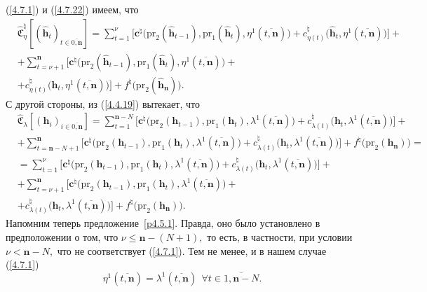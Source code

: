 \documentclass[11pt,twoside]{report}
\newcommand{\bfn}{\begin{equation}}
\newcommand{\efn}{\end{equation}}
\newcommand{\ov}{\overline}
\newcommand{\la}{\lambda}
\newcommand{\fa}{\forall}
\newcommand{\zc}{{\mathbf c}}
\newcommand{\nn}{{\mathbf n}}
\begin{document}
{{(\ref{4.7.1}) и (\ref{4.7.22}) имеем, что
\begin{eqnarray}
&\widehat{\mathfrak{C}}_\eta^\natural[(\hat{\mathbf{h}}_t)_{t\in\ov{0,\nn}}] = \sum\limits_{t=1}^\nu\bigl[
\zc^\natural\bigl(\mathrm{pr}_2(\hat{\mathbf{h}}_{t-1}),\mathrm{pr}_1(\hat{\mathbf{h}}_t),
\eta^1(\ov{t,\nn})\bigl)+ c_{\eta(t)}^\natural\bigl(\hat{\mathbf{h}}_t,\eta^1(\ov{t,\nn})\bigl)\bigl] +
&\nonumber\\
&+\sum\limits_{t=\nu+1}^\nn\bigl[
\zc^\natural\bigl(\mathrm{pr}_2(\hat{\mathbf{h}}_{t-1}),\mathrm{pr}_1(\hat{\mathbf{h}}_t),
\eta^1(\ov{t,\nn})\bigl)+
&\nonumber\\
&+c_{\eta(t)}^\natural\bigl(\hat{\mathbf{h}}_t,\eta^1(\ov{t,\nn})\bigl)\bigl] +
f^\natural\bigl(\mathrm{pr}_2(\hat{\mathbf{h}}_\nn)\bigl).
&\label{4.7.23}
\end{eqnarray}
С другой стороны, из (\ref{4.4.19}) вытекает, что
\begin{eqnarray}
&\widehat{\mathfrak{C}}_\la[(\mathbf{h}_i)_{i\in\ov{0,\nn}}] = \sum\limits_{t=1}^{\nn-N}\bigl[
\zc^\natural\bigl(\mathrm{pr}_2(\mathbf{h}_{t-1}),\mathrm{pr}_1(\mathbf{h}_t),
\la^1(\ov{t,\nn})\bigl)+ c_{\la(t)}^\natural\bigl(\mathbf{h}_t,\la^1(\ov{t,\nn})\bigl)\bigl] +
&\nonumber\\
&+\sum\limits_{t=\nn-N+1}^\nn\bigl[
\zc^\natural\bigl(\mathrm{pr}_2(\mathbf{h}_{t-1}),\mathrm{pr}_1(\mathbf{h}_t),
\la^1(\ov{t,\nn})\bigl)+ c_{\la(t)}^\natural\bigl(\mathbf{h}_t,\la^1(\ov{t,\nn})\bigl)\bigl] +
f^\natural\bigl(\mathrm{pr}_2(\mathbf{h}_\nn)\bigl)=
&\nonumber\\
&=\sum\limits_{t=1}^\nu\bigl[
\zc^\natural\bigl(\mathrm{pr}_2(\mathbf{h}_{t-1}),\mathrm{pr}_1(\mathbf{h}_t),
\la^1(\ov{t,\nn})\bigl)+ c_{\la(t)}^\natural\bigl(\mathbf{h}_t,\la^1(\ov{t,\nn})\bigl)\bigl] +
&\nonumber\\
&+\sum\limits_{t=\nu+1}^\nn\bigl[
\zc^\natural\bigl(\mathrm{pr}_2(\mathbf{h}_{t-1}),\mathrm{pr}_1(\mathbf{h}_t),
\la^1(\ov{t,\nn})\bigl)+
&\nonumber\\
&+c_{\la(t)}^\natural\bigl(\mathbf{h}_t,\la^1(\ov{t,\nn})\bigl)\bigl] +
f^\natural\bigl(\mathrm{pr}_2(\mathbf{h}_\nn)\bigl).
&\label{4.7.24}
\end{eqnarray}
Напомним теперь предложение~\ref{p4.5.1}. Правда, оно было установлено в предположении о том, что
$\nu \leqslant \nn-(N+1),$ то есть, в частности, при условии $\nu <\nn - N,$ что не соответствует
(\ref{4.7.1}). Тем не менее, и в нашем случае (\ref{4.7.1})
\bfn\label{4.7.25}\eta^1(\ov{t,\nn}) = \la^1(\ov{t,\nn})\ \ \fa t\in \ov{1,\nn-N}.
\efn

}}
\end{document}
